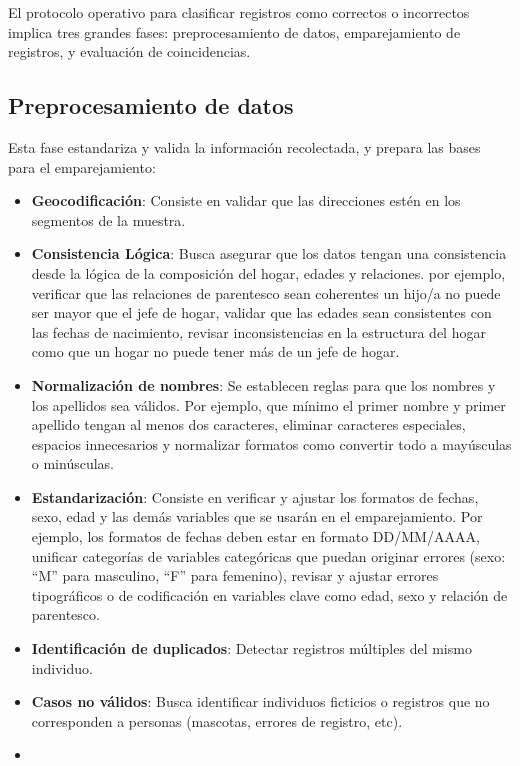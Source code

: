 \documentclass[
  12pt,
]{book}
\providecommand{\tightlist}{%
  \setlength{\itemsep}{0pt}\setlength{\parskip}{0pt}}
\begin{document}
El protocolo operativo para clasificar registros como correctos o incorrectos implica tres grandes fases: preprocesamiento de datos, emparejamiento de registros, y evaluación de coincidencias.

\subsection{Preprocesamiento de datos}\label{preprocesamiento-de-datos}

Esta fase estandariza y valida la información recolectada, y prepara las bases para el emparejamiento:

\begin{itemize}
\tightlist
\item
  \textbf{Geocodificación}: Consiste en validar que las direcciones estén en los segmentos de la muestra.
\item
  \textbf{Consistencia Lógica}: Busca asegurar que los datos tengan una consistencia desde la lógica de la composición del hogar, edades y relaciones. por ejemplo, verificar que las relaciones de parentesco sean coherentes un hijo/a no puede ser mayor que el jefe de hogar, validar que las edades sean consistentes con las fechas de nacimiento, revisar inconsistencias en la estructura del hogar como que un hogar no puede tener más de un jefe de hogar.
\item
  \textbf{Normalización de nombres}: Se establecen reglas para que los nombres y los apellidos sea válidos. Por ejemplo, que mínimo el primer nombre y primer apellido tengan al menos dos caracteres, eliminar caracteres especiales, espacios innecesarios y normalizar formatos como convertir todo a mayúsculas o minúsculas.
\item
  \textbf{Estandarización}: Consiste en verificar y ajustar los formatos de fechas, sexo, edad y las demás variables que se usarán en el emparejamiento. Por ejemplo, los formatos de fechas deben estar en formato DD/MM/AAAA, unificar categorías de variables categóricas que puedan originar errores (sexo: ``M'' para masculino, ``F'' para femenino), revisar y ajustar errores tipográficos o de codificación en variables clave como edad, sexo y relación de parentesco.
\item
  \textbf{Identificación de duplicados}: Detectar registros múltiples del mismo individuo.
\item
  \textbf{Casos no válidos}: Busca identificar individuos ficticios o registros que no corresponden a personas (mascotas, errores de registro, etc).
\item

\end{itemize}
\end{document}
